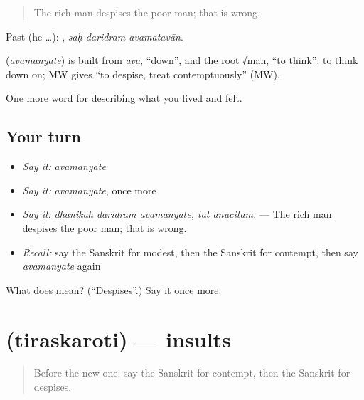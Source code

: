 \begin{quote}
The rich man despises the poor man; that is wrong.
\end{quote}

Past (he …):   , \emph{saḥ daridram avamatavān}.

\begin{cousinweb}
\textbf{} (\emph{avamanyate}) is built from \emph{ava}, \textquotedblleft{}down\textquotedblright{}, and the root √man, \textquotedblleft{}to think\textquotedblright{}: to think down on; MW gives \textquotedblleft{}to despise, treat contemptuously\textquotedblright{} (MW).
\end{cousinweb}

\begin{grammarlens}[title={What you've built}]
One more word for describing what you lived and felt.
\end{grammarlens}

\subsection*{Your turn}
\begin{itemize}
\raggedright
  \item \emph{Say it:} \emph{avamanyate}
  \item \emph{Say it:} \emph{avamanyate}, once more
  \item \emph{Say it:} \emph{dhanikaḥ daridram avamanyate, tat anucitam.} — The rich man despises the poor man; that is wrong.
  \item \emph{Recall:} say the Sanskrit for modest, then the Sanskrit for contempt, then say \emph{avamanyate} again
\end{itemize}

\begin{tcolorbox}[breakable,colback=teal!4,colframe=teal!35!black,title={Before you move on}]
What does  mean? (\textquotedblleft{}Despises\textquotedblright{}.) Say it once more.
\end{tcolorbox}
\section[\texorpdfstring{\sk{तिरस्करोति} (tiraskaroti)}{तिरस्करोति (tiraskaroti)}]{ (tiraskaroti) — insults}

\label{lesson:SA-C459-tiraskaroti}



\begin{quote}
Before the new one: say the Sanskrit for contempt, then the Sanskrit for despises.
\end{quote}

